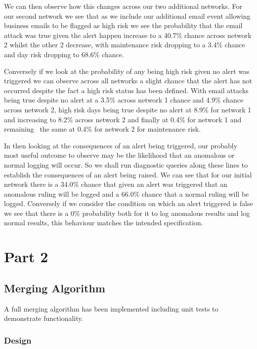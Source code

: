 \documentclass[10pt,a4paper]{article}
\begin{document}
We can then observe how this changes across our two additional networks. For our second network we see that as we include our additional email event allowing business emails to be flagged as high risk we see the probability that the email attack was true given the alert happen increase to a 40.7\% chance across network 2 whilst the other 2 decrease, with maintenance risk dropping to a 3.4\% chance and day risk dropping to 68.6\% chance.

Conversely if we look at the probability of any being high risk given no alert was triggered we can observe across all networks a slight chance that the alert has not occurred despite the fact a high risk status has been defined. With email attacks being true despite no alert at a 3.5\% across network 1 chance and 4.9\% chance across network 2, high risk days being true despite no alert at 8.9\% for network 1 and increasing to 8.2\% across network 2 and finally at 0.4\% for network 1 and remaining ~the same at 0.4\% for network 2 for maintenance risk.
                                                             
In then looking at the consequences of an alert being triggered, our probably most useful outcome to observe may be the likelihood that an anomalous or normal logging will occur. So we shall run diagnostic queries along these lines to establish the consequences of an alert being raised. We can see that for our initial network there is a 34.0\% chance that given an alert was triggered that an anomalous ruling will be logged and a 66.0\% chance that a normal ruling will be logged. Conversely if we consider the condition on which an alert triggered is false we see that there is a 0\% probability both for it to log anomalous results and log normal results, this behaviour matches the intended specification.

\section{Part 2}

\subsection{Merging Algorithm}

A full merging algorithm has been implemented including unit tests to demonstrate functionality. 
\subsubsection{Design}
\end{document}
